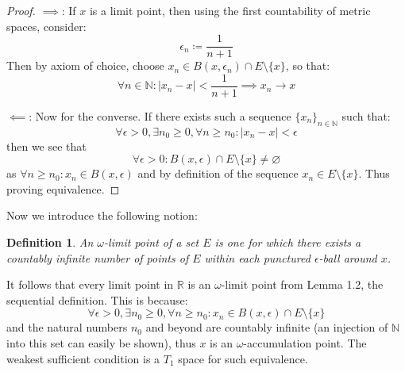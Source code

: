 \documentclass[10pt,letterpaper]{article} %
\newtheorem{defn}{Definition}[section]
\begin{document}
\begin{proof}
$\implies$: If $x$ is a limit point, then using the first countability of metric spaces, consider:
\begin{equation*}
\epsilon_n \coloneq \frac{1}{n+1}
\end{equation*} 
Then by axiom of choice, choose $x_n \in B(x, \epsilon_n) \cap E \setminus \{x\}$, so that:
\begin{equation*}
\forall n \in \mathbb{N}: |x_n - x| < \frac{1}{n+1} \implies x_n \xrightarrow{} x
\end{equation*}

$\impliedby$: Now for the converse. If there exists such a sequence $\{x_n\}_{n \in \mathbb{N}}$ such that:
\begin{equation*}
\forall \epsilon > 0, \exists n_0 \geqslant 0, \forall n \geqslant n_0: |x_n - x| < \epsilon
\end{equation*}
then we see that
\begin{equation*}
\forall \epsilon > 0: B(x, \epsilon) \cap E \setminus \{x\} \neq \varnothing
\end{equation*}
as $\forall n \geqslant n_0: x_n \in B(x, \epsilon)$ and by definition of the sequence $x_n \in E \setminus \{x\}$. Thus proving equivalence.
\end{proof}

Now we introduce the following notion:
\begin{defn}
An $\omega$-limit point of a set $E$ is one for which there exists a countably infinite number of points of $E$ within each punctured $\epsilon$-ball around $x$.
\end{defn}
It follows that every limit point in $\mathbb{R}$ is an $\omega$-limit point from Lemma 1.2, the sequential definition. This is because:
\begin{equation*}
\forall \epsilon > 0, \exists n_0 \geqslant 0, \forall n \geqslant n_0: x_n \in B(x, \epsilon) \cap E \setminus \{x\}
\end{equation*}
and the natural numbers $n_0$ and beyond are countably infinite (an injection of $\mathbb{N}$ into this set can easily be shown), thus $x$ is an $\omega$-accumulation point. The weakest sufficient condition is a $T_1$ space for such equivalence.\\
\end{document}
